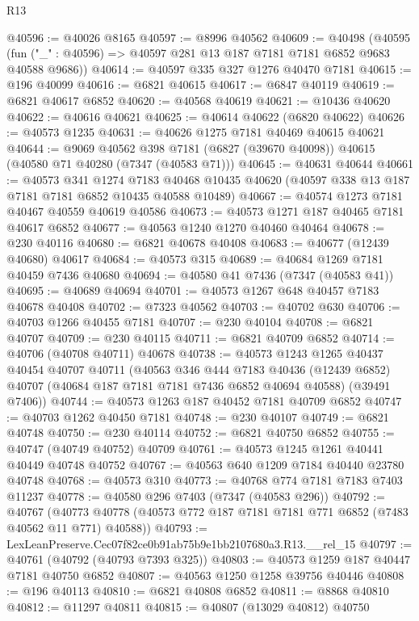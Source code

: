 \begin{lexlean}{R13}
\begin{coremodule}
@40596 := @40026 @8165
@40597 := @8996 @40562
@40609 := @40498
    (@40595 (fun ("_" : @40596) => @40597 @281 @13 @187 @7181 @7181 @6852 @9683 @40588 @9686))
@40614 := @40597 @335 @327 @1276 @40470 @7181
@40615 := @196 @40099
@40616 := @6821 @40615
@40617 := @6847 @40119
@40619 := @6821 @40617 @6852
@40620 := @40568 @40619
@40621 := @10436 @40620
@40622 := @40616 @40621
@40625 := @40614 @40622 (@6820 @40622)
@40626 := @40573 @1235
@40631 := @40626 @1275 @7181 @40469 @40615 @40621
@40644 := @9069
    @40562
    @398
    @7181
    (@6827 (@39670 @40098))
    @40615
    (@40580 @71 @40280 (@7347 (@40583 @71)))
@40645 := @40631 @40644
@40661 := @40573
    @341
    @1274
    @7183
    @40468
    @10435
    @40620
    (@40597 @338 @13 @187 @7181 @7181 @6852 @10435 @40588 @10489)
@40667 := @40574 @1273 @7181 @40467 @40559 @40619 @40586
@40673 := @40573 @1271 @187 @40465 @7181 @40617 @6852
@40677 := @40563 @1240 @1270 @40460 @40464
@40678 := @230 @40116
@40680 := @6821 @40678 @40408
@40683 := @40677 (@12439 @40680) @40617
@40684 := @40573 @315
@40689 := @40684 @1269 @7181 @40459 @7436 @40680
@40694 := @40580 @41 @7436 (@7347 (@40583 @41))
@40695 := @40689 @40694
@40701 := @40573 @1267 @648 @40457 @7183 @40678 @40408
@40702 := @7323 @40562
@40703 := @40702 @630
@40706 := @40703 @1266 @40455 @7181
@40707 := @230 @40104
@40708 := @6821 @40707
@40709 := @230 @40115
@40711 := @6821 @40709 @6852
@40714 := @40706 (@40708 @40711) @40678
@40738 := @40573
    @1243
    @1265
    @40437
    @40454
    @40707
    @40711
    (@40563
      @346
      @444
      @7183
      @40436
      (@12439 @6852)
      @40707
      (@40684 @187 @7181 @7181 @7436 @6852 @40694 @40588)
      (@39491 @7406))
@40744 := @40573 @1263 @187 @40452 @7181 @40709 @6852
@40747 := @40703 @1262 @40450 @7181
@40748 := @230 @40107
@40749 := @6821 @40748
@40750 := @230 @40114
@40752 := @6821 @40750 @6852
@40755 := @40747 (@40749 @40752) @40709
@40761 := @40573 @1245 @1261 @40441 @40449 @40748 @40752
@40767 := @40563 @640 @1209 @7184 @40440 @23780 @40748
@40768 := @40573 @310
@40773 := @40768 @774 @7181 @7183 @7403 @11237
@40778 := @40580 @296 @7403 (@7347 (@40583 @296))
@40792 := @40767
    (@40773 @40778 (@40573 @772 @187 @7181 @7181 @771 @6852 (@7483 @40562 @11 @771) @40588))
@40793 := LexLeanPreserve.Cec07f82ce0b91ab75b9e1bb2107680a3.R13.__rel_15
@40797 := @40761 (@40792 (@40793 @7393 @325))
@40803 := @40573 @1259 @187 @40447 @7181 @40750 @6852
@40807 := @40563 @1250 @1258 @39756 @40446
@40808 := @196 @40113
@40810 := @6821 @40808 @6852
@40811 := @8868 @40810
@40812 := @11297 @40811
@40815 := @40807 (@13029 @40812) @40750

\end{coremodule}
\end{lexlean}
